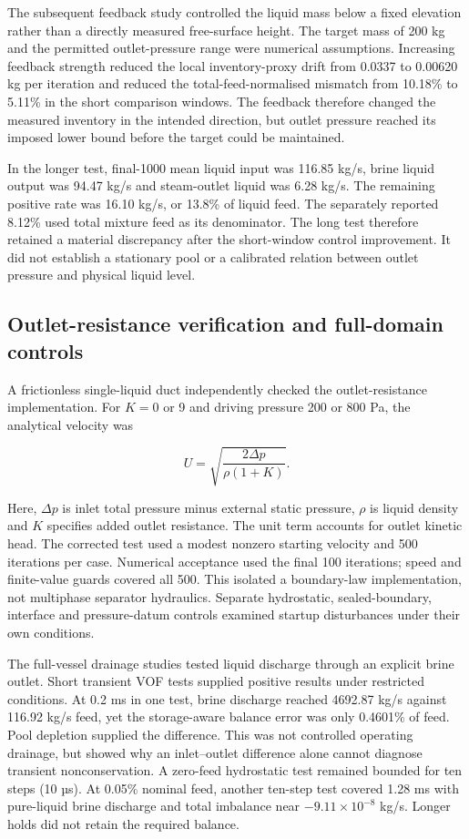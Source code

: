 The subsequent feedback study controlled the liquid mass below a fixed elevation rather than a directly measured free-surface height. The target mass of 200 kg and the permitted outlet-pressure range were numerical assumptions. Increasing feedback strength reduced the local inventory-proxy drift from 0.0337 to 0.00620 kg per iteration and reduced the total-feed-normalised mismatch from 10.18\% to 5.11\% in the short comparison windows. The feedback therefore changed the measured inventory in the intended direction, but outlet pressure reached its imposed lower bound before the target could be maintained.

In the longer test, final-1000 mean liquid input was 116.85 kg/s, brine liquid output was 94.47 kg/s and steam-outlet liquid was 6.28 kg/s. The remaining positive rate was 16.10 kg/s, or 13.8\% of liquid feed. The separately reported 8.12\% used total mixture feed as its denominator. The long test therefore retained a material discrepancy after the short-window control improvement. It did not establish a stationary pool or a calibrated relation between outlet pressure and physical liquid level.

\subsection{Outlet-resistance verification and full-domain controls}

A frictionless single-liquid duct independently checked the outlet-resistance implementation. For \(K=0\) or 9 and driving pressure 200 or 800 Pa, the analytical velocity was

\[U=\sqrt{\frac{2\Delta p}{\rho(1+K)}}.\]

Here, \(\Delta p\) is inlet total pressure minus external static pressure, \(\rho\) is liquid density and \(K\) specifies added outlet resistance. The unit term accounts for outlet kinetic head. The corrected test used a modest nonzero starting velocity and 500 iterations per case. Numerical acceptance used the final 100 iterations; speed and finite-value guards covered all 500. This isolated a boundary-law implementation, not multiphase separator hydraulics. Separate hydrostatic, sealed-boundary, interface and pressure-datum controls examined startup disturbances under their own conditions.

The full-vessel drainage studies tested liquid discharge through an explicit brine outlet. Short transient VOF tests supplied positive results under restricted conditions. At 0.2 ms in one test, brine discharge reached 4692.87 kg/s against 116.92 kg/s feed, yet the storage-aware balance error was only 0.4601\% of feed. Pool depletion supplied the difference. This was not controlled operating drainage, but showed why an inlet--outlet difference alone cannot diagnose transient nonconservation. A zero-feed hydrostatic test remained bounded for ten steps (10 µs). At 0.05\% nominal feed, another ten-step test covered 1.28 ms with pure-liquid brine discharge and total imbalance near \(-9.11\times10^{-8}\) kg/s. Longer holds did not retain the required balance.

